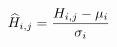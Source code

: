 \documentclass[preview]{standalone}
\begin{document}
\begin{align*}
\special{dvisvgm:raw <g id='unique000'>}\widehat{H}_{i,j} = \dfrac{H_{i,j} - \mu_i}{\sigma_i}\special{dvisvgm:raw </g>}
\end{align*}
\end{document}
